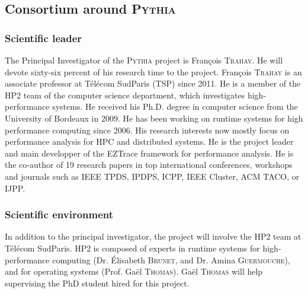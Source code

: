 \documentclass[a4paper,11pt,defblank]{article}
\newcommand{\pname}{\textsc{Pythia}\xspace}
\begin{document}
% 
% 


\subsection{Consortium around \pname}
\vspace{0.8cm}
\subsubsection{Scientific leader}
The Principal Investigator of the \pname project is François
\textsc{Trahay}. He will devote sixty-six percent of his research time to
the project.  François \textsc{Trahay} is an associate professor at
Télécom SudParis (TSP) since 2011.
%
He is a member of the HP2 team of the computer science
department, which investigates high-performance systems.
%
He received his Ph.D. degree in computer science from the University
of Bordeaux in 2009. He has been working on runtime systems for high
performance computing since 2006. His research interests now mostly
focus on performance analysis for HPC and distributed systems. He is
the project leader and main developper of the EZTrace framework for
performance analysis.
%
He is the co-author of 19 research papers in top international
conferences, workshops and journals such as IEEE TPDS, IPDPS, ICPP,
IEEE Cluster, ACM TACO, or IJPP.
\vspace{0.3cm}
\subsubsection{Scientific environment}
In addition to the principal investigator, the project will involve
the HP2 team at Télécom SudParis. HP2 is composed of experts in
runtime systems for high-performance computing (Dr. {\'E}lisabeth
\textsc{Brunet}, and Dr. Amina \textsc{Guermouche}), and for operating
systems (Prof. Gaël \textsc{Thomas}). Gaël \textsc{Thomas} will help
supervising the PhD student hired for this project.
\end{document}

